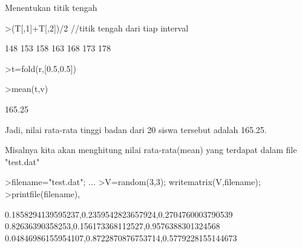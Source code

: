 \documentclass[a4paper,10pt]{article}
\begin{document}
\begin{eulernotebook}
\begin{eulercomment}
\begin{eulercomment}
\begin{eulercomment}
\begin{eulercomment}
\begin{eulercomment}
\begin{eulercomment}
\begin{eulercomment}
Menentukan titik tengah
\end{eulercomment}
\begin{eulerprompt}
>(T[,1]+T[,2])/2 //titik tengah dari tiap interval
\end{eulerprompt}
\begin{euleroutput}
        148 
        153 
        158 
        163 
        168 
        173 
        178 
\end{euleroutput}
\begin{eulerprompt}
>t=fold(r,[0.5,0.5])
\end{eulerprompt}
\begin{euleroutput}
  [148,  153,  158,  163,  168,  173,  178]
\end{euleroutput}
\begin{eulerprompt}
>mean(t,v)
\end{eulerprompt}
\begin{euleroutput}
  165.25
\end{euleroutput}
\begin{eulercomment}
Jadi, nilai rata-rata tinggi badan dari 20 siswa tersebut adalah
165.25.

\end{eulercomment}
\begin{eulercomment}
Misalnya kita akan menghitung nilai rata-rata(mean) yang terdapat
dalam file "test.dat"
\end{eulercomment}
\begin{eulerprompt}
>filename="test.dat"; ...
>V=random(3,3); writematrix(V,filename);
>printfile(filename),
\end{eulerprompt}
\begin{euleroutput}
  0.1858294139595237,0.2359542823657924,0.2704760003790539
  0.82636390358253,0.156173368112527,0.9576388301324568
  0.04846986155954107,0.8722870876753714,0.5779228155144673
  

\end{euleroutput}
\end{eulercomment}
\end{eulercomment}
\end{eulercomment}
\end{eulercomment}
\end{eulercomment}
\end{eulercomment}
\end{eulernotebook}
\end{document}
